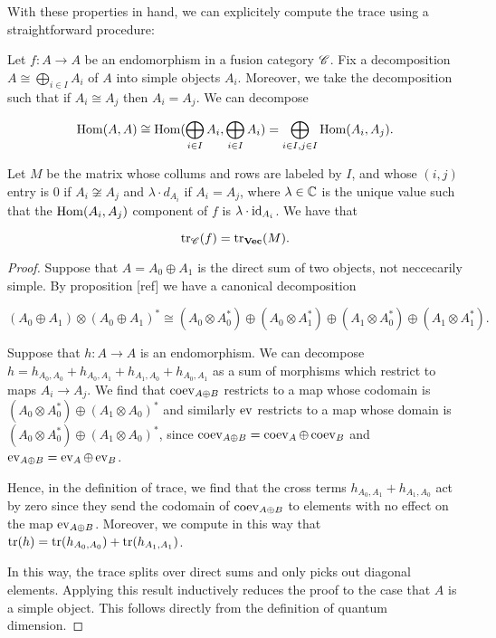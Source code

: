 With these properties in hand, we can explicitely compute the trace using a straightforward procedure:

\begin{corollary} Let $f:A\to A$ be an endomorphism in a fusion category $\mathscr{C}$. Fix a decomposition $A\cong \bigoplus_{i\in I}A_i$ of $A$ into simple objects $A_i$. Moreover, we take the decomposition such that if $A_i\cong A_j$ then $A_i=A_j$. We can decompose

$$\operatorname{Hom}(A,A)\cong \operatorname{Hom}(\bigoplus_{i\in I} A_i,\bigoplus_{i\in I}A_i)=\bigoplus_{i\in I, j\in I}\operatorname{Hom}(A_i,A_j).$$

Let $M$ be the matrix whose collums and rows are labeled by $I$, and whose $(i,j)$ entry is $0$ if $A_i\not\cong A_j$ and $\lambda \cdot d_{A_i}$ if $A_i=A_j$, where $\lambda\in \mathbb{C}$ is the unique value such that the $\operatorname{Hom}(A_i,A_j)$ component of $f$ is $\lambda\cdot \operatorname{id}_{A_i}$. We have that

$$\operatorname{tr}_{\mathscr{C}}(f)=\operatorname{tr}_{\mathbf{Vec}}(M).$$

\end{corollary}
\begin{proof} Suppose that $A=A_0\oplus A_1$ is the direct sum of two objects, not neccecarily simple. By proposition [ref] we have a canonical decomposition

$$(A_0\oplus A_1)\otimes (A_0\oplus A_1)^*\cong (A_0\otimes A_0^*) \oplus (A_0\otimes A_1^*) \oplus (A_1\otimes A_0^{*})\oplus (A_1\otimes A_1^*).$$

Suppose that $h:A\to A$ is an endomorphism. We can decompose $h=h_{A_0,A_0}+h_{A_0,A_1}+h_{A_1,A_0}+h_{A_0,A_1}$ as a sum of morphisms which restrict to maps $A_i\to A_j$. We find that $\operatorname{coev}_{A\oplus B}$ restricts to a map whose codomain is  $(A_0\otimes A_0^*) \oplus (A_1\otimes A_0)^*$ and similarly $\operatorname{ev}$ restricts to a map whose domain is $(A_0\otimes A_0^*) \oplus (A_1\otimes A_0)^*$, since $\operatorname{coev}_{A\oplus B}=\operatorname{coev}_{A}\oplus \operatorname{coev}_{B}$ and $\operatorname{ev}_{A\oplus B}=\operatorname{ev}_{A}\oplus \operatorname{ev}_{B}$.

Hence, in the definition of trace, we find that the cross terms $h_{A_0,A_1}+h_{A_1,A_0}$ act by zero since they send the codomain of $\operatorname{coev}_{A\oplus B}$ to elements with no effect on the map $\operatorname{ev}_{A\oplus B}$. Moreover, we compute in this way that $\operatorname{tr}(h)=\operatorname{tr}(h_{A_0,A_0})+\operatorname{tr}(h_{A_1,A_1})$.

In this way, the trace splits over direct sums and only picks out diagonal elements. Applying this result inductively reduces the proof to the case that $A$ is a simple object. This follows directly from the definition of quantum dimension.
\end{proof}

